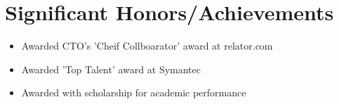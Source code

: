 \documentclass[11pt,a4paper,roman]{moderncv}       %
\begin{document}


\section{Significant Honors/Achievements}

\vspace{6pt}
 
\begin{itemize}
    \item Awarded CTO's 'Cheif Collboarator' award at relator.com
    \item Awarded 'Top Talent' award at Symantec
    \item Awarded with scholarship for academic performance 
\end{itemize}

\nocite{*}



\end{document}
